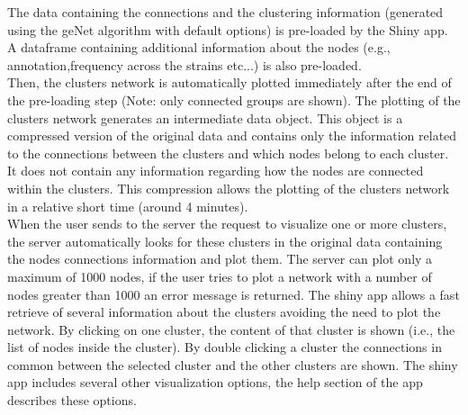 \documentclass{article}
\begin{document}
The data containing the connections and the clustering information (generated using the geNet algorithm with default options) is pre-loaded by the Shiny app. A dataframe containing additional information about the nodes (e.g., annotation,frequency across the strains etc...) is also pre-loaded.\\
Then, the clusters network is automatically plotted immediately after the end of the pre-loading step (Note: only connected groups are shown).
The plotting of the clusters network generates an intermediate data object. This object is a compressed version of the original data and contains only the information related to the connections between the clusters and which nodes belong to each cluster. It does not contain any information regarding how the nodes are connected within the clusters. This compression allows the plotting of the clusters network in a relative short time (around 4 minutes).\\
When the user sends to the server the request to visualize  
one or more clusters, the server automatically looks for these clusters in the original data containing the nodes connections information and plot them.
The server can plot only a maximum of 1000 nodes, if the user tries to plot a network with a number of nodes greater than 1000 an error message is returned.
The shiny app allows a fast retrieve of several information about the clusters avoiding the need to plot the network. By clicking on one cluster, the content of that cluster is shown (i.e., the list of nodes inside the cluster). By double clicking a cluster the connections in common between the selected cluster and the other clusters are shown. The shiny app includes several other visualization options, the help section of the app describes these options.



\end{document}

